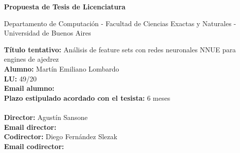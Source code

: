 \begin{titlepage}
\begin{center}

\vspace*{0.5cm}

\huge\bfseries
Propuesta de Tesis de Licenciatura

\vspace*{0.5cm}

\large Departamento de Computación - Facultad de Ciencias Exactas y Naturales - Universidad de Buenos Aires

\end{center}

\vspace*{0.5cm}

\noindent
\textbf{Título tentativo:} Análisis de feature sets con redes neuronales NNUE para engines de ajedrez \\
\textbf{Alumno:} Martín Emiliano Lombardo \\
\textbf{LU:} 49/20 \\
\textbf{Email alumno:} \href{mailto:mlombardo9@gmail.com}{} \\
\textbf{Plazo estipulado acordado con el tesista:} 6 meses
\\\\
\textbf{Director:} Agustín Sansone \\
\textbf{Email director:} \href{mailto:agustinsansone7@gmail.com}{} \\
\textbf{Codirector:} Diego Fernández Slezak \\
\textbf{Email codirector:} \href{mailto:dfslezak@dc.uba.ar}{} \\

\vspace*{\fill}
\end{titlepage}
